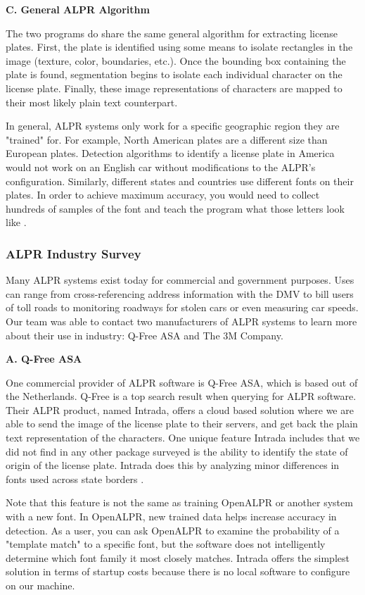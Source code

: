 \documentclass[11pt, oneside, fullpage, doublespace]{article}
\begin{document}
\textbf{C. General ALPR Algorithm}

The two programs do share the same general algorithm for extracting license plates. First, the plate is identified using some means to isolate rectangles in the image (texture, color, boundaries, etc.). Once the bounding box containing the plate is found, segmentation begins to isolate each individual character on the license plate. Finally, these image representations of characters are mapped to their most likely plain text counterpart.

In general, ALPR systems only work for a specific geographic region they are "trained" for. For example, North American plates are a different size than European plates. Detection algorithms to identify a license plate in America would not work on an English car without modifications to the ALPR's configuration. Similarly, different states and countries use different fonts on their plates. In order to achieve maximum accuracy, you would need to collect hundreds of samples of the font and teach the program what those letters look like \cite{nikolaos2006}.


\subsubsection{ALPR Industry Survey}
Many ALPR systems exist today for commercial and government purposes. Uses can range from cross-referencing address information with the DMV to bill users of toll roads to monitoring roadways for stolen cars or even measuring car speeds. Our team was able to contact two manufacturers of ALPR systems to learn more about their use in industry: Q-Free ASA and The 3M Company.

\textbf{A. Q-Free ASA}

One commercial provider of ALPR software is Q-Free ASA, which is based out of the Netherlands. Q-Free is a top search result when querying for ALPR software. Their ALPR product, named Intrada, offers a cloud based solution where we are able to send the image of the license plate to their servers, and get back the plain text representation of the characters. One unique feature Intrada includes that we did not find in any other package surveyed is the ability to identify the state of origin of the license plate. Intrada does this by analyzing minor differences in fonts used across state borders \cite{intrada2014}.

Note that this feature is not the same as training OpenALPR or another system with a new font. In OpenALPR, new trained data helps increase accuracy in detection. As a user, you can ask OpenALPR to examine the probability of a "template match" to a specific font, but the software does not intelligently determine which font family it most closely matches. Intrada offers the simplest solution in terms of startup costs because there is no local software to configure on our machine.
\end{document}
